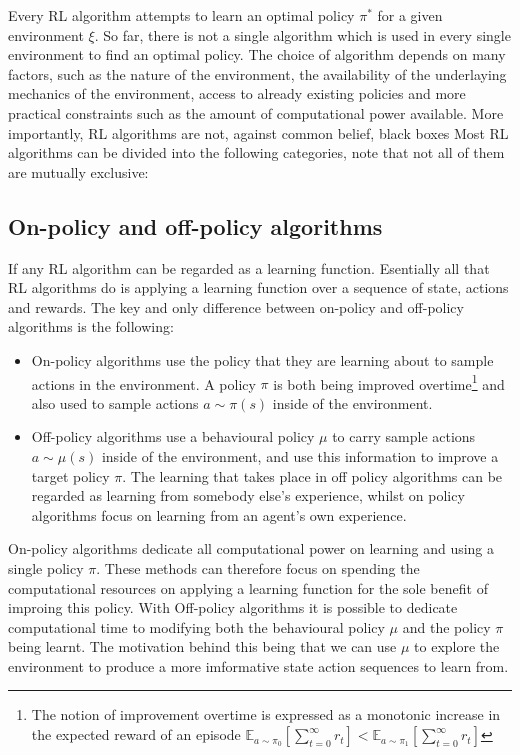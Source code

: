 \documentclass{../main.tex}{}
\begin{document}


Every RL algorithm attempts to learn an optimal policy $\pi^*$ for a given environment $\xi$. So far, there is not a single algorithm which is used in every single environment to find an optimal policy. The choice of algorithm depends on many factors, such as the nature of the environment, the availability of the underlaying mechanics of the environment, access to already existing policies and more practical constraints such as the amount of computational power available. More importantly, RL algorithms are not, against common belief, black boxes Most RL algorithms can be divided into the following categories, note that not all of them are mutually exclusive:

\subsection{On-policy and off-policy algorithms}

If any RL algorithm can be regarded as a learning function. Esentially all that RL algorithms do is applying a learning function over a sequence of state, actions and rewards. The key and only difference between on-policy and off-policy algorithms is the following:
\begin{itemize}
    \item On-policy algorithms use the policy that they are learning about to sample actions in the environment. A policy $\pi$ is both being improved overtime\footnote{The notion of improvement overtime is expressed as a monotonic increase in the expected reward of an episode $\mathbb{E}_{a \sim \pi_0}[\sum_{t=0}^{\infty}r_t] < \mathbb{E}_{a \sim \pi_1}[\sum_{t=0}^{\infty}r_t]$} and also used to sample actions $a \sim \pi(s)$ inside of the environment.
    \item Off-policy algorithms use a behavioural policy $\mu$ to carry sample actions $a \sim \mu(s)$ inside of the environment, and use this information to improve a target policy $\pi$. The learning that takes place in off policy algorithms can be regarded as learning from somebody else's experience, whilst on policy algorithms focus on learning from an agent's own experience.
\end{itemize}

On-policy algorithms dedicate all computational power on learning and using a single policy $\pi$. These methods can therefore focus on spending the computational resources on applying a learning function for the sole benefit of improing this policy. With Off-policy algorithms it is possible to dedicate computational time to modifying both the behavioural policy $\mu$ and the policy $\pi$ being learnt. The motivation behind this being that we can use $\mu$ to explore the environment to produce a more imformative state action sequences to learn from.
\end{document}
